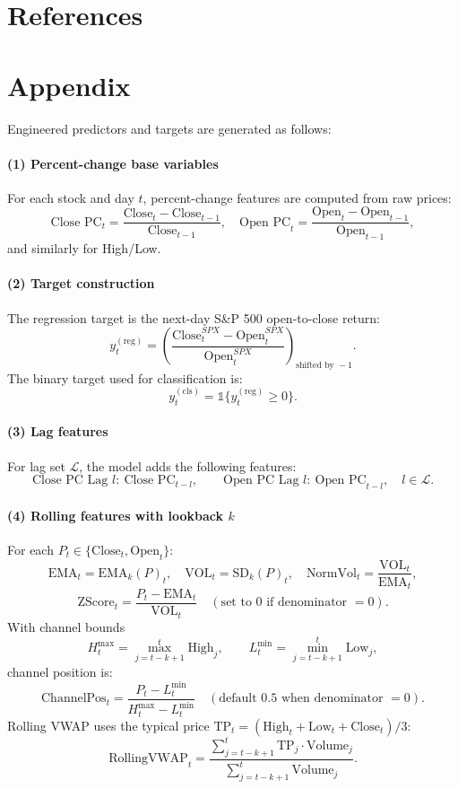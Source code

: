 \documentclass[11pt]{article}
\begin{document}
\section*{References}


\appendix
\section{Appendix}
Engineered predictors and targets are generated as follows:
\paragraph{(1) Percent-change base variables}
For each stock and day \(t\), percent-change features are computed from raw prices:
\[
\text{Close PC}_t=\frac{\text{Close}_t-\text{Close}_{t-1}}{\text{Close}_{t-1}},\quad
\text{Open PC}_t=\frac{\text{Open}_t-\text{Open}_{t-1}}{\text{Open}_{t-1}},
\]
and similarly for High/Low.

\paragraph{(2) Target construction}
The regression target is the next-day S\&P 500 open-to-close return:
\[
y^{(\mathrm{reg})}_t=
\left(\frac{\text{Close}^{SPX}_t-\text{Open}^{SPX}_t}{\text{Open}^{SPX}_t}\right)_{\text{shifted by }-1}.
\]
The binary target used for classification is:
\[
y^{(\mathrm{cls})}_t=\mathbb{1}\{y^{(\mathrm{reg})}_t\ge 0\}.
\]

\paragraph{(3) Lag features}
For lag set \(\mathcal{L}\), the model adds the following features:
\[
\text{Close PC Lag }l:\ \text{Close PC}_{t-l},\qquad
\text{Open PC Lag }l:\ \text{Open PC}_{t-l},\quad l\in\mathcal{L}.
\]

\paragraph{(4) Rolling features with lookback \(k\)}
For each \(P_t\in\{\text{Close}_t,\text{Open}_t\}\):
\[
\mathrm{EMA}_t=\mathrm{EMA}_k(P)_t,\quad
\mathrm{VOL}_t=\mathrm{SD}_k(P)_t,\quad
\text{NormVol}_t=\frac{\mathrm{VOL}_t}{\mathrm{EMA}_t},
\]
\[
\text{ZScore}_t=\frac{P_t-\mathrm{EMA}_t}{\mathrm{VOL}_t}
\quad(\text{set to }0\text{ if denominator }=0).
\]
With channel bounds
\[
H^{\max}_t=\max_{j=t-k+1}^{t}\text{High}_j,\qquad
L^{\min}_t=\min_{j=t-k+1}^{t}\text{Low}_j,
\]
channel position is:
\[
\text{ChannelPos}_t=\frac{P_t-L^{\min}_t}{H^{\max}_t-L^{\min}_t}
\quad(\text{default }0.5\text{ when denominator }=0).
\]
Rolling VWAP uses the typical price \(\text{TP}_t=(\text{High}_t+\text{Low}_t+\text{Close}_t)/3\):
\[
\text{RollingVWAP}_t=
\frac{\sum_{j=t-k+1}^{t}\text{TP}_j\cdot \text{Volume}_j}
{\sum_{j=t-k+1}^{t}\text{Volume}_j}.
\]
\end{document}
